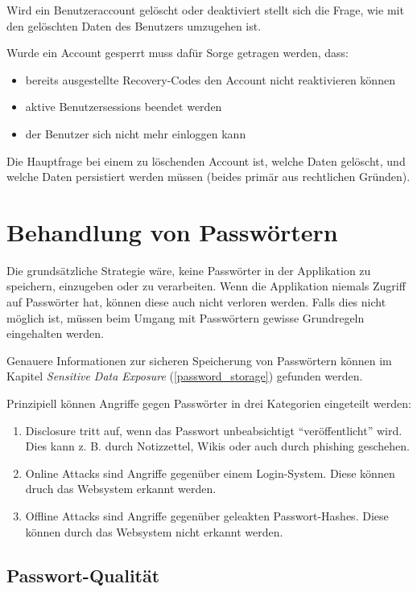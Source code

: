 Wird ein Benutzeraccount gelöscht oder deaktiviert stellt sich die Frage, wie mit den gelöschten Daten des Benutzers umzugehen ist.

Wurde ein Account gesperrt muss dafür Sorge getragen werden, dass:

\begin{itemize}
	\item bereits ausgestellte Recovery-Codes den Account nicht reaktivieren können
	\item aktive Benutzersessions beendet werden
	\item der Benutzer sich nicht mehr einloggen kann
\end{itemize}

Die Hauptfrage bei einem zu löschenden Account ist, welche Daten gelöscht, und welche Daten persistiert werden müssen (beides primär aus rechtlichen Gründen).

\section{Behandlung von Passwörtern}

Die grundsätzliche Strategie wäre, keine Passwörter in der Applikation zu speichern, einzugeben oder zu verarbeiten. Wenn die Applikation niemals Zugriff auf Passwörter hat, können diese auch nicht verloren werden. Falls dies nicht möglich ist, müssen beim Umgang mit Passwörtern gewisse Grundregeln eingehalten werden.

Genauere Informationen zur sicheren Speicherung von Passwörtern können im Kapitel \textit{Sensitive Data Exposure} (\ref{password_storage}) gefunden werden.

Prinzipiell können Angriffe gegen Passwörter in drei Kategorien eingeteilt werden:

\begin{enumerate}
	\item Disclosure tritt auf, wenn das Passwort unbeabsichtigt ``veröffentlicht'' wird. Dies kann z. B. durch Notizzettel, Wikis oder auch durch phishing geschehen.
	\item Online Attacks sind Angriffe gegenüber einem Login-System. Diese können druch das Websystem erkannt werden.
	\item Offline Attacks sind Angriffe gegenüber geleakten Passwort-Hashes. Diese können durch das Websystem nicht erkannt werden.
\end{enumerate}

\subsection{Passwort-Qualität}

